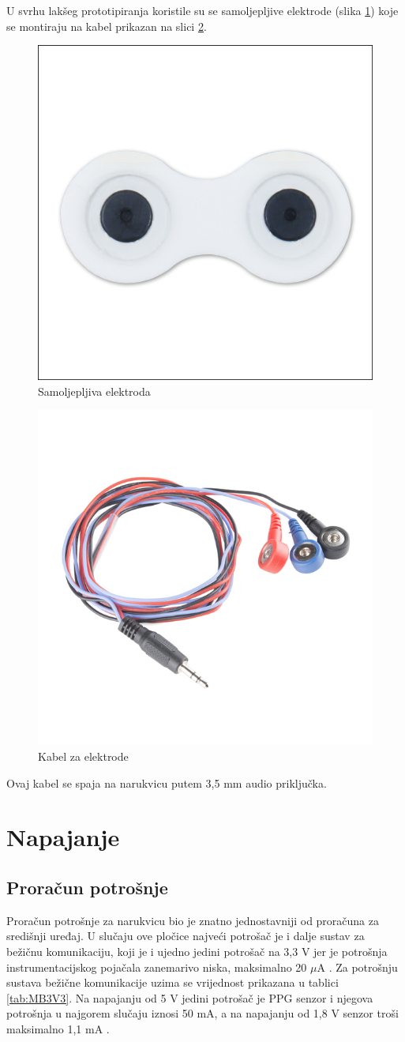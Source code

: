 U svrhu lakšeg prototipiranja koristile su se samoljepljive elektrode (slika \ref{slk:ELECTRODE}) koje se montiraju na kabel prikazan na slici \ref{slk:CABLE}. 
\begin{figure}[htb]
    \centering
    \includegraphics[width=6 cm]{Figures/ELECTRODE-BOTTOM.jpg}
    \caption{Samoljepljiva elektroda}
    \label{slk:ELECTRODE}
\end{figure}
\begin{figure}
    \centering
    \includegraphics[width=6 cm]{Figures/CABLE.jpg}
    \caption{Kabel za elektrode}
    \label{slk:CABLE}
\end{figure}
Ovaj kabel se spaja na narukvicu putem 3,5 mm audio priključka.

\section{Napajanje}
\subsection{Proračun potrošnje}

Proračun potrošnje za narukvicu bio je znatno jednostavniji od proračuna za središnji uređaj. U slučaju ove pločice najveći potrošač je i dalje sustav za bežičnu komunikaciju, koji je i ujedno jedini potrošač na 3,3 V jer je potrošnja instrumentacijskog pojačala zanemarivo niska, maksimalno 20 $\mu\textrm{A}$ \cite{ad:ad8226}. Za potrošnju sustava bežične komunikacije uzima se vrijednost prikazana u tablici \ref{tab:MB3V3}. Na napajanju od 5 V jedini potrošač je PPG senzor i njegova potrošnja u najgorem slučaju iznosi 50 mA, a na napajanju od 1,8 V senzor troši maksimalno 1,1 mA \cite{ad:max30101}.

